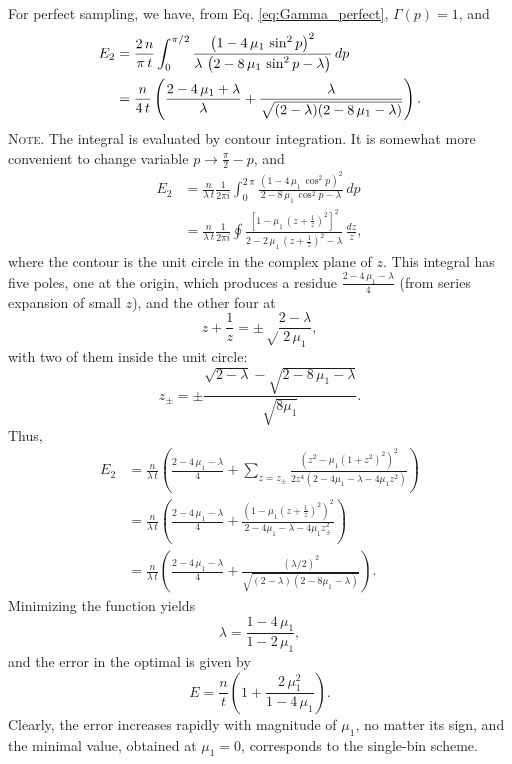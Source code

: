 \documentclass[reprint]{revtex4-1}
\newcommand{\note}[1]{{\color{DarkGreen}\footnotesize \textsc{Note.} #1}}
\newcommand{\Err}{E}
\begin{document}
For perfect sampling,
we have, from Eq. \eqref{eq:Gamma_perfect},
$\Gamma(p) = 1$, and
$$
\begin{aligned}
\Err_2
&=
\frac{2 \, n}{\pi \, t}
\int_0^{\pi/2}
\frac{ \left(1 - 4 \, \mu_1 \, \sin^2 p \right)^2 }
{ \lambda \, \left(2 - 8 \, \mu_1 \, \sin^2 p - \lambda \right) }
\, dp
\notag \\
&=
\frac{n}{4 \, t}
\left(
  \frac{2 - 4 \, \mu_1 + \lambda}{ \lambda }
  +
  \frac{ \lambda }
  { \sqrt{ (2 - \lambda) (2 - 8 \, \mu_1 - \lambda) } }
\right).
\end{aligned}
$$
\note{The integral is evaluated by contour integration.
%
It is somewhat more convenient to change variable $p \to \frac{ \pi } { 2 } - p$,
and
$$
\begin{aligned}
\Err_2
&=
\frac{n}{\lambda \, t}
\frac{1}{2 \pi i}
\int_0^{2 \, \pi}
\frac{ \left(1 - 4 \, \mu_1 \, \cos^2 p \right)^2 }
{ 2 - 8 \, \mu_1 \, \cos^2 p - \lambda }
\, dp
\\
&=
\frac{n}{\lambda \, t}
\frac{1}{2 \pi i}
\oint
\frac{ \left[1 - \mu_1 \, \left(z+\frac{1}{z}\right)^2 \right]^2 }
{ 2 - 2 \, \mu_1 \, \left(z + \frac{1}{z}\right)^2 - \lambda }
\, \frac{dz}{z},
\end{aligned}
$$
where the contour is the unit circle
in the complex plane of $z$.
%
This integral has five poles, one at the origin,
which produces a residue $\frac{2 - 4 \, \mu_1 - \lambda}{4}$
(from series expansion of small $z$),
and the other four at
$$
z + \frac{1}{z} = \pm\sqrt\frac{2-\lambda}{2 \, \mu_1},
$$
with two of them inside the unit circle:
$$
z_\pm = \pm \frac{\sqrt{2-\lambda} -\sqrt{2 - 8 \, \mu_1 - \lambda}}
{\sqrt{8 \mu_1}}.
$$
Thus,
$$
\begin{aligned}
\Err_2
&=
\frac{n}{\lambda \, t}
\left(
 \frac{2 - 4 \, \mu_1 - \lambda}{4}
 +
 \sum_{z = z_{\pm} }
 \frac{ \left(z^2 - \mu_1 (1 + z^2)^2 \right)^2 }
 { 2 z^4 (2 - 4 \mu_1 - \lambda - 4 \mu_1 z^2) }
\right)
\\
&=
\frac{n}{\lambda \, t}
\left(
  \frac{2 - 4 \, \mu_1 - \lambda}{4}
 +
 \frac{ \left(1 - \mu_1 \left(z + \frac{1}{z} \right)^2 \right)^2 }
 { 2 - 4 \mu_1 - \lambda - 4 \mu_1 z_{\pm}^2 }
\right)
\\
&=
\frac{n}{\lambda \, t}
\left(
  \frac{2 - 4 \, \mu_1 - \lambda}{4}
 +
 \frac{ (\lambda/2)^2 }
 { \sqrt{(2-\lambda) (2 - 8 \mu_1 -\lambda)} }
\right).
\end{aligned}
$$
}
%
Minimizing the function yields
%
\begin{equation}
\lambda = \frac{1 - 4 \, \mu_1} { 1 - 2 \, \mu_1 },
\label{eq:lambda_tridiag_perfect}
\end{equation}
%
and the error in the optimal is given by
%
\begin{equation}
\Err
=
\frac{n}{t}
\left(
  1+ \frac{2 \, \mu_1^2}{1-4 \, \mu_1}
\right).
\label{eq:error_tridiag_prefect}
\end{equation}
%
Clearly, the error
increases rapidly with magnitude of $\mu_1$,
no matter its sign,
and the minimal value, obtained at $\mu_1 = 0$,
corresponds to the single-bin scheme.
\end{document}
